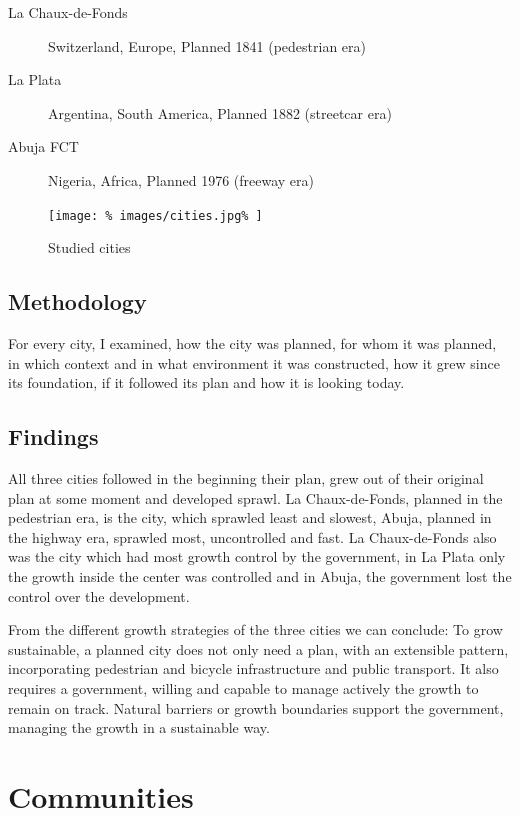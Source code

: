 \documentclass{article}
\begin{document}
		\begin{description}
			\item [La Chaux-de-Fonds] Switzerland, Europe, Planned 1841 (pedestrian era)
			\item [La Plata] Argentina, South America, Planned 1882 (streetcar era)
			\item [Abuja FCT] Nigeria, Africa, Planned 1976 (freeway era)
		\end{description}
		
		\begin{figure}[H]
			\texttt{[image: \%
				images/cities.jpg\%
			]}
			\caption{Studied cities \cite{BingMaps:Cities}}
			\label{fig:map:analyzed-cities}
		\end{figure}

		\subsection{Methodology}
		For every city, I examined, how the city was planned, for whom it was planned, in which context and in what environment it was constructed, how it grew since its foundation, if it followed its plan and how it is looking today.

		\subsection{Findings}
		All three cities followed in the beginning their plan, grew out of their original plan at some moment and developed sprawl.
		La Chaux-de-Fonds, planned in the pedestrian era, is the city, which sprawled least and slowest, Abuja, planned in the highway era, sprawled most, uncontrolled and fast.
		La Chaux-de-Fonds also was the city which had most growth control by the government, in La Plata only the growth inside the center was controlled and in Abuja, the government lost the control over the development.
		
		From the different growth strategies of the three cities we can conclude:
		To grow sustainable, a planned city does not only need a plan, with an extensible pattern, incorporating pedestrian and bicycle infrastructure and public transport. It also requires a government, willing and capable to manage actively the growth to remain on track.
		Natural barriers or growth boundaries support the government, managing the growth in a sustainable way.



	\clearpage	
	\section{Communities}
	
\end{document}
